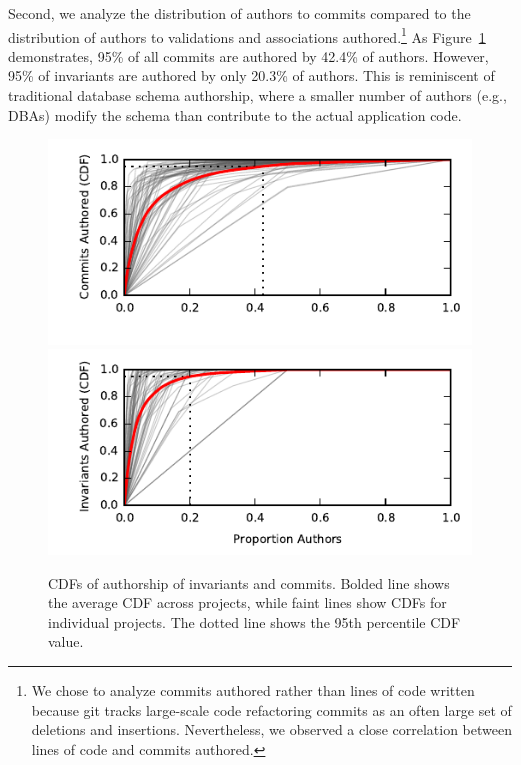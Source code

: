 Second, we analyze the distribution of authors to commits compared to
the distribution of authors to validations and associations
authored.\footnote{We chose to analyze commits authored rather than
  lines of code written because git tracks large-scale code
  refactoring commits as an often large set of deletions and
  insertions. Nevertheless, we observed a close correlation between
  lines of code and commits authored.} As Figure~\ref{fig:cdfs}
demonstrates, 95\% of all commits are authored by 42.4\% of
authors. However, 95\% of invariants are authored by only 20.3\% of
authors. This is reminiscent of traditional database schema
authorship, where a smaller number of authors (e.g., DBAs) modify the
schema than contribute to the actual application code.

\begin{figure}
  \newcommand{\skipht}{\\[-2em]}
\includegraphics[width=\columnwidth]{figs/commit-authorship-cdf.pdf}\vspace{-2em}
\includegraphics[width=\columnwidth]{figs/invariant-authorship-cdf.pdf}\vspace{-1em}
\caption{CDFs of authorship of invariants and commits. Bolded line
  shows the average CDF across projects, while faint lines show CDFs
  for individual projects. The dotted line shows the 95th percentile
  CDF value. }
\label{fig:cdfs}
\end{figure}

